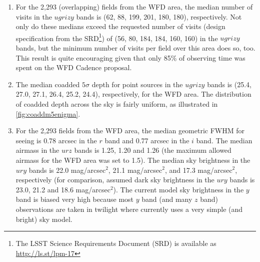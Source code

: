 \begin{enumerate}
{here: (23.62, 24.85, 24.39, 23.94, 23.36, 22.45) in the $ugrizy$
bands, respectively. These values are similar, but not identical, to the values
listed in Table 2 from the latest version (v3.1) of the LSST overview
paper: (23.68, 24.89, 24.43, 24.00, 23.45, 22.60). This discrepancy
is due to continuing improvements in the system performance estimates.}.
These values are shallower than
the zenith dark time values for three main reasons: the sky is expected to be
brighter for non-dark time and away from zenith, the sky brightness model
currently implemented in \OpSim has some shortcomings (a new model will
be implemented in version 4), and the moon avoidance is not as aggressive
as it could be (many observations are taken very close to the moon avoidance limit of 30 degrees, rather than farther away where the sky is darker). As a result, the median limiting depths above are brighter than typical zenith dark-time images by close
to 1 mag in the $z$ and $y$ bands, and a few tenths of a magnitude in the
$u$, $g$ and $i$ bands.
\item For the 2,293 (overlapping) fields from the WFD area,
the median number of visits in the $ugrizy$ bands is (62, 88, 199, 201, 180,
180), respectively. Not only do these medians exceed the requested
number of visits (design specification from the SRD\footnote{The LSST
Science Requirements Document (SRD) is available as
\url{http://ls.st/lpm-17}}) of (56, 80, 184, 184, 160, 160) in the $ugrizy$
bands, but the minimum number of visits per field over this area does
so, too. This result is quite encouraging given that
only 85\% of observing time was spent on the WFD Cadence proposal.
\item The median coadded $5\sigma$ depth
for point sources in the $ugrizy$ bands is (25.4, 27.0, 27.1, 26.4,
25.2, 24.4), respectively, for the WFD area. The distribution
of coadded depth across the sky is fairly uniform, as illustrated in \autoref{fig:coaddm5enigma}.
\item For the 2,293 fields from the WFD area, the median
geometric FWHM for seeing is 0.78 arcsec in the $r$ band and 0.77 arcsec
in the $i$ band. The median airmass in the $urz$ bands is 1.25, 1.20 and 1.26
(the maximum allowed airmass for the WFD area was set to
1.5).  The median sky brightness in the $ury$ bands is 22.0 mag/arcsec$^2$,
21.1 mag/arcsec$^2$, and 17.3 mag/arcsec$^2$, respectively (for comparison,
assumed dark sky brightness in the $ury$ bands is 23.0, 21.2 and 18.6
mag/arcsec$^2$).  The current model sky brightness in the $y$ band is biased
very high because most $y$ band (and many $z$ band) observations are taken in twilight where \OpSim currently uses a very simple (and bright) sky model.

\end{enumerate}
